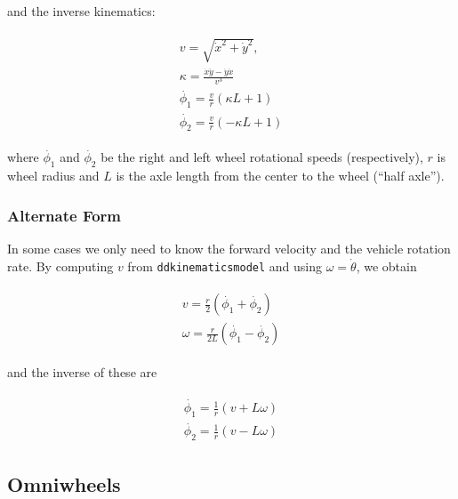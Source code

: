 and the inverse kinematics:

\[\begin{aligned}
\boxed{
\begin{array}{l}
v = \sqrt{\dot{x}^2 + \dot{y}^2},\\[2mm]
\kappa =   \displaystyle  \frac{\dot{x}\ddot{y} - \dot{y}\ddot{x}}{v^3} \\[3mm]
\dot{\phi_1} = \displaystyle \frac{v}{r}\left(\kappa L + 1\right) \\[3mm]
\dot{\phi_2} = \displaystyle \frac{v}{r}\left(-\kappa L + 1\right)
\end{array}}
\end{aligned}\]

where \(\dot{\phi_1}\) and \(\dot{\phi_2}\) be the right and left wheel
rotational speeds (respectively), \(r\) is wheel radius and \(L\) is the
axle length from the center to the wheel (``half axle'').

\hypertarget{alternate-form}{%
\subsubsection{Alternate Form}\label{alternate-form}}

In some cases we only need to know the forward velocity and the vehicle
rotation rate. By computing \(v\) from \texttt{ddkinematicsmodel} and
using \(\omega = \dot{\theta}\), we obtain

\[\begin{aligned}
\begin{array}{l}
v = \frac{r}{2} (\dot{\phi_1}+\dot{\phi_2}) \\[5mm]
\omega = \frac{r}{2L} (\dot{\phi_1}-\dot{\phi_2})
\end{array}
\end{aligned}\]

and the inverse of these are

\[\begin{aligned}
\begin{array}{l}
\dot{\phi_1} = \frac{1}{r} (v+L\omega)\\[5mm]
\dot{\phi_2} = \frac{1}{r} (v-L\omega)
\end{array}
\end{aligned}\]

\hypertarget{omniwheels}{%
\subsection{Omniwheels}\label{omniwheels}}

